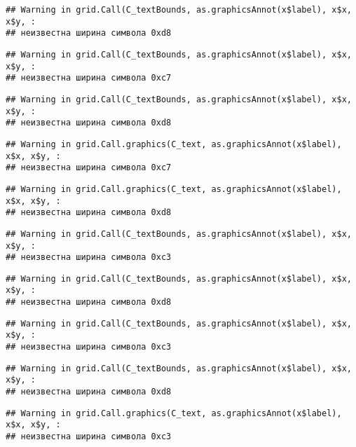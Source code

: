 \documentclass[
]{article}
\begin{document}
\begin{verbatim}
## Warning in grid.Call(C_textBounds, as.graphicsAnnot(x$label), x$x, x$y, :
## неизвестна ширина символа 0xd8
\end{verbatim}

\begin{verbatim}
## Warning in grid.Call(C_textBounds, as.graphicsAnnot(x$label), x$x, x$y, :
## неизвестна ширина символа 0xc7
\end{verbatim}

\begin{verbatim}
## Warning in grid.Call(C_textBounds, as.graphicsAnnot(x$label), x$x, x$y, :
## неизвестна ширина символа 0xd8
\end{verbatim}

\begin{verbatim}
## Warning in grid.Call.graphics(C_text, as.graphicsAnnot(x$label), x$x, x$y, :
## неизвестна ширина символа 0xc7
\end{verbatim}

\begin{verbatim}
## Warning in grid.Call.graphics(C_text, as.graphicsAnnot(x$label), x$x, x$y, :
## неизвестна ширина символа 0xd8
\end{verbatim}

\begin{verbatim}
## Warning in grid.Call(C_textBounds, as.graphicsAnnot(x$label), x$x, x$y, :
## неизвестна ширина символа 0xc3
\end{verbatim}

\begin{verbatim}
## Warning in grid.Call(C_textBounds, as.graphicsAnnot(x$label), x$x, x$y, :
## неизвестна ширина символа 0xd8
\end{verbatim}

\begin{verbatim}
## Warning in grid.Call(C_textBounds, as.graphicsAnnot(x$label), x$x, x$y, :
## неизвестна ширина символа 0xc3
\end{verbatim}

\begin{verbatim}
## Warning in grid.Call(C_textBounds, as.graphicsAnnot(x$label), x$x, x$y, :
## неизвестна ширина символа 0xd8
\end{verbatim}

\begin{verbatim}
## Warning in grid.Call.graphics(C_text, as.graphicsAnnot(x$label), x$x, x$y, :
## неизвестна ширина символа 0xc3
\end{verbatim}
\end{document}
